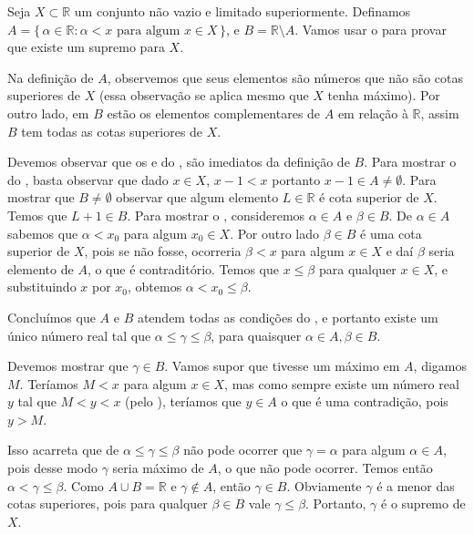 \documentclass[../main.tex]{subfiles}
\begin{document}
\begin{dem}
    Seja $X \subset \mathbb{R}$ um conjunto não vazio e limitado superiormente. 
    Definamos $A = \{\, \alpha \in \mathbb{R} : \alpha < x \text{ para algum } x \in X \,\}$, e $B = \mathbb{R} \setminus A$.
    Vamos usar o  para provar que existe um supremo para $X$.

    Na definição de $A$, observemos que seus elementos são números que não são cotas superiores de $X$ (essa observação se aplica mesmo que $X$ tenha máximo). Por outro lado, em $B$ estão os elementos complementares de $A$ em relação à $\mathbb{R}$, assim $B$ tem todas as cotas superiores de $X$.

    Devemos observar que os  e  do , são imediatos da definição de $B$.
    Para mostrar o  do , basta observar que dado $x \in X$, $x-1 < x$ portanto $x-1 \in A \neq \emptyset$.
    Para mostrar que $B \neq \emptyset$ observar que algum elemento $L \in \mathbb{R}$ é cota superior de $X$. Temos que $L + 1 \in B$.
    Para mostrar o , consideremos $\alpha \in A$ e $\beta \in B$. De $\alpha \in A$ sabemos que $\alpha < x_0$ para algum $x_0 \in X$. Por outro lado $\beta \in B$ é uma cota superior de $X$, pois se não fosse, ocorreria $\beta < x$ para algum $x \in X$ e daí $\beta$ seria elemento de $A$, o que é contraditório. Temos que $x \leq \beta$ para qualquer $x \in X$, e substituindo $x$ por $x_0$, obtemos $\alpha < x_0 \leq \beta$.

    Concluímos que $A$ e $B$ atendem todas as condições do , e portanto existe um único número real tal que 
    $\alpha \leq \gamma \leq \beta$, para quaisquer $\alpha \in A, \beta \in B$.

    Devemos mostrar que $\gamma \in B$. Vamos supor que tivesse um máximo em $A$, digamos $M$. Teríamos $M < x$ para algum $x \in X$, mas como sempre existe um número real $y$ tal que $M < y < x$ (pelo ), teríamos que $y \in A$ o que é uma contradição, pois $y > M$.

    Isso acarreta que de $\alpha \leq \gamma \leq \beta$ não pode ocorrer que $\gamma = \alpha$ para algum $\alpha \in A$, pois desse modo $\gamma$ seria máximo de $A$, o que não pode ocorrer. Temos então $\alpha < \gamma \leq \beta$. Como $A \cup B = \mathbb{R}$ e $\gamma \not\in A$, então 
    $\gamma \in B$. Obviamente $\gamma$ é a menor das cotas superiores, pois para qualquer $\beta \in B$ vale $\gamma \leq \beta$. Portanto, $\gamma$ é o supremo de $X$.
\end{dem}
\end{document}
